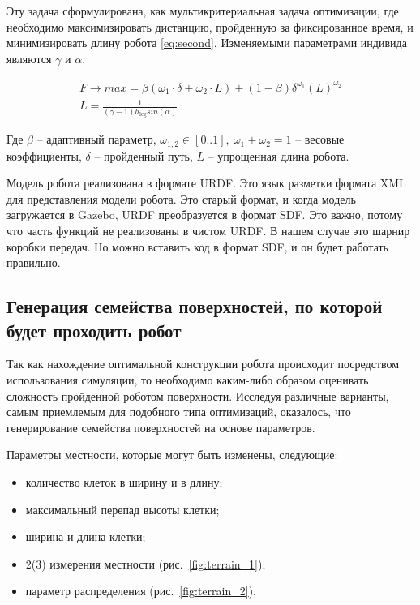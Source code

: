 Эту задача сформулирована, как мультикритериальная задача оптимизации, где необходимо максимизировать дистанцию, пройденную за фиксированное время, и минимизировать длину робота \eqref{eq:second}. Изменяемыми параметрами индивида являются  $\gamma$ и $\alpha$.

\begin{align}
    \label{eq:second}
    F \rightarrow max = \beta \left( {\omega}_{1} \cdot \delta + {\omega}_{2} \cdot L\right) + (1 - \beta) {\delta}^{{\omega}_{1}} {\left( L\right)}^{{\omega}_{2}} \\
    L = \frac{1}{(\gamma - 1) h_{\text{leg}}sin(\alpha)}
\end{align}

Где $\beta$ -- адаптивный параметр, ${\omega}_{1,2} \in  [ 0..1 ],\ \omega_1 + \omega_2 = 1 $ -- весовые коэффициенты, $\delta$ -- пройденный путь, $L$ -- упрощенная длина робота.

Модель робота реализована в формате URDF. Это язык разметки формата XML для представления модели робота. Это старый формат, и когда модель загружается в Gazebo, URDF преобразуется в формат SDF. Это важно, потому что часть функций не реализованы в чистом URDF. В нашем случае это шарнир коробки передач. Но можно вставить код в формат SDF, и он будет работать правильно.

\subsection{Генерация семейства поверхностей, по которой будет проходить робот}
Так как нахождение оптимальной конструкции робота происходит посредством использования симуляции, то необходимо каким-либо образом оценивать сложность пройденной роботом поверхности. Исследуя различные варианты, самым приемлемым для подобного типа оптимизаций, оказалось, что генерирование семейства поверхностей на основе параметров.

Параметры местности, которые могут быть изменены, следующие:
\begin{itemize}
\item количество клеток в ширину и в длину;
\item максимальный перепад высоты клетки;
\item ширина и длина клетки;
\item 2(3) измерения местности (рис.~\ref{fig:terrain_1});
\item параметр распределения (рис.~\ref{fig:terrain_2}).
\end{itemize}

